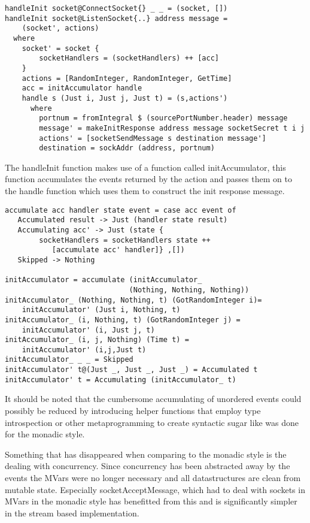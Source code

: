 \begin{lstlisting}[caption={The init handler}]
handleInit socket@ConnectSocket{} _ _ = (socket, [])
handleInit socket@ListenSocket{..} address message =
    (socket', actions)
  where
    socket' = socket { 
        socketHandlers = (socketHandlers) ++ [acc]
    }
    actions = [RandomInteger, RandomInteger, GetTime]
    acc = initAccumulator handle
    handle s (Just i, Just j, Just t) = (s,actions')
      where
        portnum = fromIntegral $ (sourcePortNumber.header) message
        message' = makeInitResponse address message socketSecret t i j
        actions' = [socketSendMessage s destination message']
        destination = sockAddr (address, portnum)
\end{lstlisting}

The handleInit function makes use of a function called initAccumulator, this function accumulates the events returned by the action and passes them on to the handle function which uses them to construct the init response message.

\begin{lstlisting}[caption={The init handler}]
accumulate acc handler state event = case acc event of
   Accumulated result -> Just (handler state result)
   Accumulating acc' -> Just (state {
        socketHandlers = socketHandlers state ++
           [accumulate acc' handler]} ,[])
   Skipped -> Nothing

initAccumulator = accumulate (initAccumulator_ 
                             (Nothing, Nothing, Nothing))
initAccumulator_ (Nothing, Nothing, t) (GotRandomInteger i)=
    initAccumulator' (Just i, Nothing, t)
initAccumulator_ (i, Nothing, t) (GotRandomInteger j) =
    initAccumulator' (i, Just j, t)
initAccumulator_ (i, j, Nothing) (Time t) =
    initAccumulator' (i,j,Just t)
initAccumulator_ _ _ = Skipped
initAccumulator' t@(Just _, Just _, Just _) = Accumulated t
initAccumulator' t = Accumulating (initAccumulator_ t)
\end{lstlisting}

It should be noted that the cumbersome accumulating of unordered events could possibly be reduced by introducing helper functions that employ type introspection or other metaprogramming to create syntactic sugar like was done for the monadic style. 

Something that has disappeared when comparing to the monadic style is the dealing with concurrency. Since concurrency has been abstracted away by the events the MVars were no longer necessary and all datastructures are clean from mutable state.
Especially socketAcceptMessage, which had to deal with sockets in MVars in the monadic style has benefitted from this and is significantly simpler in the stream based implementation.
